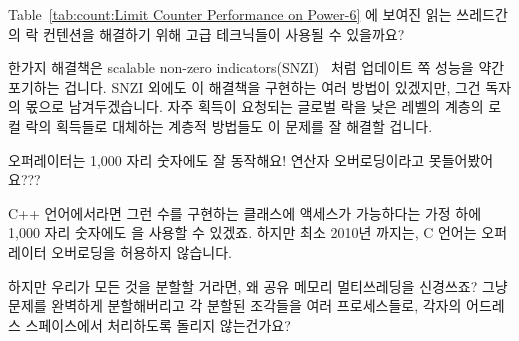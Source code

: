 \begin{enumerate}
\QuickQ{}
	Table~\ref{tab:count:Limit Counter Performance on Power-6} 에 보여진
	읽는 쓰레드간의 락 컨텐션을 해결하기 위해 고급 테크닉들이 사용될 수
	있을까요?

\QuickA{}
	한가지 해결책은 scalable non-zero
	indicators(SNZI)~\cite{FaithEllen:2007:SNZI} 처럼 업데이트 쪽 성능을
	약간 포기하는 겁니다.
	SNZI 외에도 이 해결책을 구현하는 여러 방법이 있겠지만, 그건 독자의
	몫으로 남겨두겠습니다.
	자주 획득이 요청되는 글로벌 락을 낮은 레벨의 계층의 로컬 락의 획득들로
	대체하는 계층적 방법들도 이 문제를 잘 해결할 겁니다.

\QuickQ{}
	\co{++} 오퍼레이터는 1,000 자리 숫자에도 잘 동작해요!
	연산자 오버로딩이라고 못들어봤어요???

\QuickA{}
	C++ 언어에서라면 그런 수를 구현하는 클래스에 액세스가 가능하다는 가정
	하에 1,000 자리 숫자에도 \co{++} 을 사용할 수 있겠죠.
	하지만 최소 2010년 까지는, C 언어는 오퍼레이터 오버로딩을 허용하지
	않습니다.

\QuickQ{}
	하지만 우리가 모든 것을 분할할 거라면, 왜 공유 메모리 멀티쓰레딩을
	신경쓰죠?
	그냥 문제를 완벽하게 분할해버리고 각 분할된 조각들을 여러 프로세스들로,
	각자의 어드레스 스페이스에서 처리하도록 돌리지 않는건가요?
	\iffalse


\end{enumerate}
